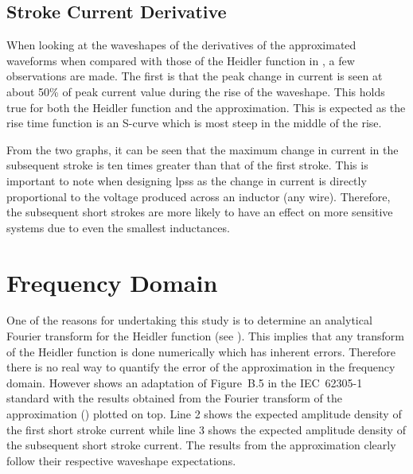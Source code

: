 \subsection{Stroke Current Derivative}
\label{sub:discussion_stroke_current_derivative}
When looking at the waveshapes of the derivatives of the approximated waveforms when compared with those of the Heidler function in , a few observations are made. The first is that the peak change in current is seen at about 50\% of peak current value during the rise of the waveshape. This holds true for both the Heidler function and the approximation. This is expected as the rise time function is an S-curve which is most steep in the middle of the rise.

From the two graphs, it can be seen that the maximum change in current in the subsequent stroke is ten times greater than that of the first stroke. This is important to note when designing \glspl{lps} as the change in current is directly proportional to the voltage produced across an inductor (any wire). Therefore, the subsequent short strokes are more likely to have an effect on more sensitive systems due to even the smallest inductances.


\section{Frequency Domain}
\label{sec:discussion_frequency_domain}
One of the reasons for undertaking this study is to determine an analytical Fourier transform for the Heidler function (see ). This implies that any transform of the Heidler function is done numerically which has inherent errors. Therefore there is no real way to quantify the error of the approximation in the frequency domain. However  shows an adaptation of Figure~B.5 in the IEC~62305-1 standard with the results obtained from the Fourier transform of the approximation () plotted on top.
Line 2 shows the expected amplitude density of the first short stroke current while line 3 shows the expected amplitude density of the subsequent short stroke current. The results from the approximation clearly follow their respective waveshape expectations.

